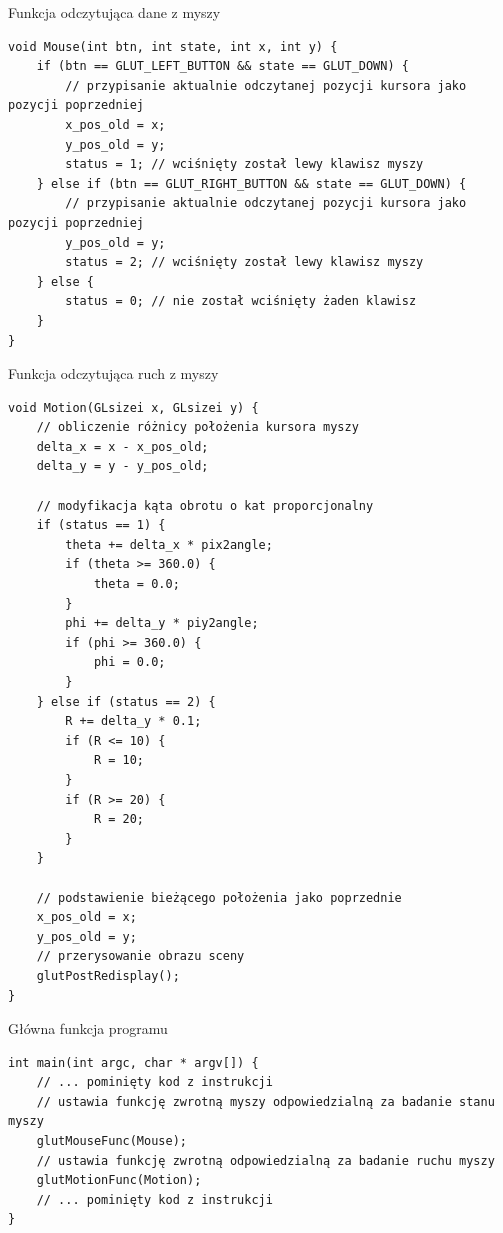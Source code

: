 \documentclass[12pt,a4paper,titlepage]{article}
\begin{document}
\begin{listing}[H]
\caption{Funkcja odczytująca dane z myszy}
\begin{verbatim}
void Mouse(int btn, int state, int x, int y) {
    if (btn == GLUT_LEFT_BUTTON && state == GLUT_DOWN) {
        // przypisanie aktualnie odczytanej pozycji kursora jako pozycji poprzedniej
        x_pos_old = x;
        y_pos_old = y;
        status = 1; // wciśnięty został lewy klawisz myszy
    } else if (btn == GLUT_RIGHT_BUTTON && state == GLUT_DOWN) {
        // przypisanie aktualnie odczytanej pozycji kursora jako pozycji poprzedniej
        y_pos_old = y;
        status = 2; // wciśnięty został lewy klawisz myszy
    } else {
        status = 0; // nie został wciśnięty żaden klawisz
    }
}
\end{verbatim}
\end{listing}

\begin{listing}[H]
\caption{Funkcja odczytująca ruch z myszy}
\begin{verbatim}
void Motion(GLsizei x, GLsizei y) {
    // obliczenie różnicy położenia kursora myszy
    delta_x = x - x_pos_old;
    delta_y = y - y_pos_old;

    // modyfikacja kąta obrotu o kat proporcjonalny
    if (status == 1) {
        theta += delta_x * pix2angle;
        if (theta >= 360.0) {
            theta = 0.0;
        }
        phi += delta_y * piy2angle;
        if (phi >= 360.0) {
            phi = 0.0;
        }
    } else if (status == 2) {
        R += delta_y * 0.1;
        if (R <= 10) {
            R = 10;
        }
        if (R >= 20) {
            R = 20;
        }
    }

    // podstawienie bieżącego położenia jako poprzednie
    x_pos_old = x;
    y_pos_old = y;
    // przerysowanie obrazu sceny
    glutPostRedisplay();
}
\end{verbatim}
\end{listing}

\begin{listing}[H]
\caption{Główna funkcja programu}
\begin{verbatim}
int main(int argc, char * argv[]) {
    // ... pominięty kod z instrukcji
    // ustawia funkcję zwrotną myszy odpowiedzialną za badanie stanu myszy
    glutMouseFunc(Mouse);
    // ustawia funkcję zwrotną odpowiedzialną za badanie ruchu myszy
    glutMotionFunc(Motion);
    // ... pominięty kod z instrukcji
}
\end{verbatim}
\end{listing}
\end{document}
